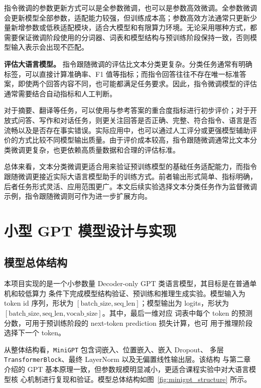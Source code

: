 \documentclass[UTF8,a4paper,zihao=-4,fontset=none]{ctexart}
\numberwithin{equation}{section}
\begin{document}
指令微调的参数更新方式可以是全参数微调，也可以是参数高效微调。全参数微调会更新模型全部参数，适配能力较强，但训练成本高；参数高效方法通常只更新少量新增参数或低秩适配模块，适合大模型和有限算力环境。无论采用哪种方式，都需要保证微调阶段使用的分词器、词表和模型结构与预训练阶段保持一致，否则模型输入表示会出现不匹配。

\textbf{评估大语言模型。} 指令跟随微调的评估比文本分类更复杂。分类任务通常有明确标签，可以直接计算准确率、F1 值等指标；而指令回答往往不存在唯一标准答案，即使两个回答内容不同，也可能都满足任务要求。因此，指令微调模型的评估通常需要结合自动指标和人工判断。

对于摘要、翻译等任务，可以使用与参考答案的重合度指标进行初步评价；对于开放式问答、写作和对话任务，则更关注回答是否正确、完整、符合指令、语言是否流畅以及是否存在事实错误。实际应用中，也可以通过人工评分或更强模型辅助评价的方式比较不同模型输出质量。由于评价成本较高，指令跟随微调通常比文本分类微调更复杂，也更依赖高质量数据和合理的评估标准。

总体来看，文本分类微调更适合用来验证预训练模型的基础任务适配能力，而指令跟随微调更接近实际大语言模型助手的训练方式。前者输出形式简单、指标明确，后者任务形式灵活、应用范围更广。本文后续实验选择文本分类任务作为监督微调示例，指令跟随微调则可作为进一步扩展方向。



\section{小型 GPT 模型设计与实现}

\subsection{模型总体结构}

本项目实现的是一个小参数量 Decoder-only GPT 类语言模型，其目标是在普通单机和较低算力
条件下完成模型结构验证、预训练和推理生成实验。模型输入为 token id 序列，形状为
$[\mathrm{batch\_size},\mathrm{seq\_len}]$；模型输出为 logits，形状为
$[\mathrm{batch\_size},\mathrm{seq\_len},\mathrm{vocab\_size}]$。其中，最后一维对应
词表中每个 token 的预测分数，可用于预训练阶段的 next-token prediction 损失计算，也可
用于推理阶段选择下一个 token。

从整体结构看，\texttt{MiniGPT} 包含词嵌入、位置嵌入、嵌入 Dropout、
多层 \texttt{TransformerBlock}、最终 LayerNorm 以及无偏置线性输出层。该结构
与第二章介绍的 GPT 基本原理一致，但参数规模明显减小，更适合课程实验中对大语言模型核
心机制进行复现和验证。模型总体结构如图~\ref{fig:minigpt_structure} 所示。
\end{document}
